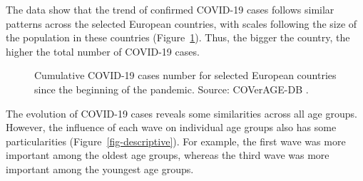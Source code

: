 \documentclass[Harvard,Times1COL]{WileyNJDv5}
\begin{document}
{The data show that the trend of confirmed COVID-19 cases follows similar
patterns across the selected European countries, with scales following
the size of the population in these countries
(Figure~\ref{fig-overall}). Thus, the bigger the country, the higher the
total number of COVID-19 cases.

\begin{figure}[h]


\caption{\label{fig-overall}Cumulative COVID-19 cases number for
selected European countries since the beginning of the pandemic. Source:
COVerAGE-DB \citep{riffe2021data}.}

\end{figure}%

The evolution of COVID-19 cases reveals some similarities across all age
groups. However, the influence of each wave on individual age groups
also has some particularities (Figure~\ref{fig-descriptive}). For
example, the first wave was more important among the oldest age groups,
whereas the third wave was more important among the youngest age groups.

\begin{figure}[h]

\end{figure}}
\end{document}
